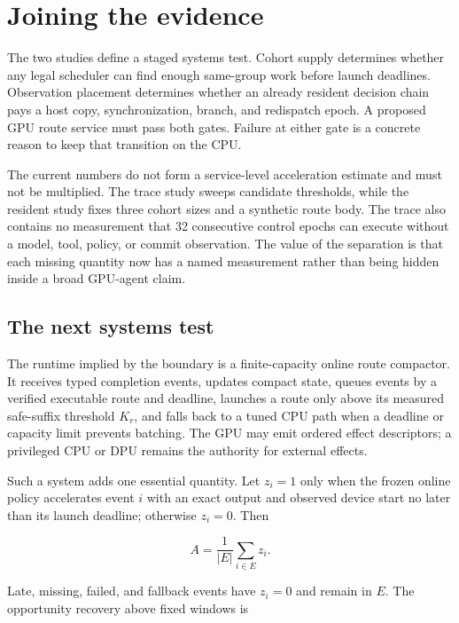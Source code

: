 \section{Joining the evidence}
\label{sec:interpretation}

The two studies define a staged systems test. Cohort supply determines whether
any legal scheduler can find enough same-group work before launch deadlines.
Observation placement determines whether an already resident decision chain
pays a host copy, synchronization, branch, and redispatch epoch. A proposed GPU
route service must pass both gates. Failure at either gate is a concrete reason
to keep that transition on the CPU.

The current numbers do not form a service-level acceleration estimate and must
not be multiplied.
The trace study sweeps candidate thresholds, while the resident study fixes
three cohort sizes and a synthetic route body. The trace also contains no
measurement that 32 consecutive control epochs can execute without a model,
tool, policy, or commit observation. The value of the separation is that each
missing quantity now has a named measurement rather than being hidden inside a
broad GPU-agent claim.

\subsection{The next systems test}

The runtime implied by the boundary is a finite-capacity online route compactor.
It receives typed completion events, updates compact state, queues events by a
verified executable route and deadline, launches a route only above its
measured safe-suffix threshold $K_r$, and falls back to a tuned CPU path when a
deadline or capacity limit prevents batching. The GPU may emit ordered effect
descriptors; a privileged CPU or DPU remains the authority for external
effects.

Such a system adds one essential quantity. Let $z_i=1$ only when the frozen
online policy accelerates event $i$ with an exact output and observed device
start no later than its launch deadline; otherwise $z_i=0$. Then

\begin{equation}
  A=\frac{1}{|E|}\sum_{i\in E}z_i.
\end{equation}

Late, missing, failed, and fallback events have $z_i=0$ and remain in $E$. The
opportunity recovery above fixed windows is

